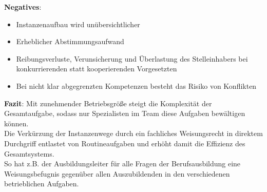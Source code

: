 \documentclass[10pt]{article}
\begin{document}
\textbf{Negatives}:
\begin{itemize}
\item Instanzenaufbau wird unübersichtlicher
\item Erheblicher Abstimmungsaufwand
\item Reibungsverluste, Verunsicherung und Überlastung des Stelleinhabers bei konkurrierenden statt kooperierenden Vorgesetzten
\item Bei nicht klar abgegrenzten Kompetenzen besteht das Risiko von Konflikten
\end{itemize}
\textbf{Fazit}:
Mit zunehmender Betriebsgröße steigt die Komplexität der Gesamtaufgabe, sodass nur Spezialisten im Team diese Aufgaben bewältigen können. \\
Die Verkürzung der Instanzenwege durch ein fachliches Weisungsrecht in direktem Durchgriff entlastet von Routineaufgaben und erhöht damit die Effizienz des Gesamtsystems. \\
So hat z.B. der Ausbildungsleiter für alle Fragen der Berufsausbildung eine Weisungsbefugnis gegenüber allen Auszubildenden in den verschiedenen betrieblichen Aufgaben.
\end{document}
